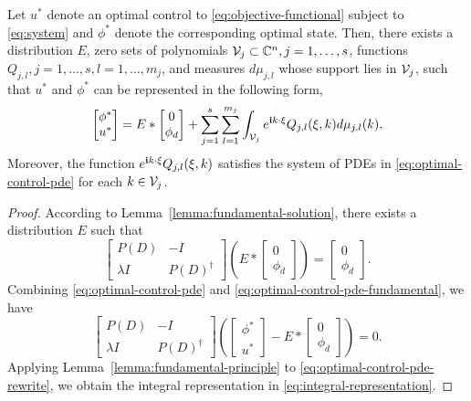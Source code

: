 \documentclass[letterpaper, 10 pt, conference]{ieeeconf}  %
\begin{document}
\begin{theorem}\label{thm:integral-representation}
Let $u^*$ denote an optimal control to \eqref{eq:objective-functional} subject to \eqref{eq:system} and $\phi^*$ denote the corresponding optimal state. Then, there exists a distribution $E$, zero sets of polynomials $\mathcal V_j\subset \mathbb{C}^n, j=1,\ldots,s$, functions $Q_{j,l}, j=1,\ldots,s, l=1,\ldots,m_j$, and measures $d\mu_{j,l}$ whose support lies in $\mathcal V_j$, such that $u^*$ and $\phi^*$ can be represented in the following form,
\begin{equation}\label{eq:integral-representation}
   \begin{bmatrix}
      \phi^* \\
      u^*
   \end{bmatrix} = E \ast \begin{bmatrix}
      0 \\
      \phi_d
   \end{bmatrix} + \sum_{j=1}^{s}\sum_{l=1}^{m_j}\int_{\mathcal V_j} e^{\mathbf{i} k \cdot \xi} Q_{j,l}(\xi,k) d\mu_{j,l}(k).
\end{equation}
Moreover, the function $e^{\mathbf{i} k \cdot \xi} Q_{j,l}(\xi,k)$ satisfies the system of PDEs in \eqref{eq:optimal-control-pde} for each $k\in \mathcal V_j$.
\end{theorem}
\begin{proof}
According to Lemma~\ref{lemma:fundamental-solution}, there exists a distribution $E$ such that
\begin{equation}\label{eq:optimal-control-pde-fundamental}
   \begin{bmatrix}
      P(D) & -I \\
       \lambda I &P(D)^\dagger 
   \end{bmatrix}
   \left(
   E \ast
   \begin{bmatrix}
      0 \\
      \phi_d
   \end{bmatrix}
   \right)
   = \begin{bmatrix}
      0 \\
      \phi_d
   \end{bmatrix}.
\end{equation}
Combining \eqref{eq:optimal-control-pde} and \eqref{eq:optimal-control-pde-fundamental}, we have
\begin{equation}\label{eq:optimal-control-pde-rewrite}
   \begin{bmatrix}
      P(D) & -I \\
       \lambda I &P(D)^\dagger 
   \end{bmatrix}
   \left(
   \begin{bmatrix}
      \phi^* \\
      u^* 
   \end{bmatrix}
   - E \ast
   \begin{bmatrix}
      0 \\
      \phi_d   
   \end{bmatrix}
   \right)
   = 0.
\end{equation}
Applying Lemma~\ref{lemma:fundamental-principle} to \eqref{eq:optimal-control-pde-rewrite}, we obtain the integral representation in \eqref{eq:integral-representation}.
\end{proof}
\end{document}
